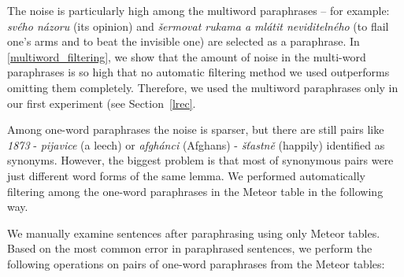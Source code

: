 \documentclass[11pt]{article}
\def\Sref#1{Section~\ref{#1}}
\begin{document}
The noise is particularly high among the multiword paraphrases -- for example: \textit{svého názoru} 
(its opinion) and \textit{šermovat rukama a mlátit neviditelného} (to flail one's arms and to beat 
the invisible one) are selected as a paraphrase. In \ref{multiword_filtering}, we show that the amount 
of noise in the multi-word paraphrases is so high that no automatic filtering method we used outperforms 
omitting them completely. Therefore, we used the multiword paraphrases only in our first experiment (see
\Sref{lrec}.

Among one-word paraphrases the noise is sparser, but there are still pairs like \textit{1873} - 
\textit{pijavice} (a leech) or \textit{afgh\'{a}nci} (Afghans) - \textit{š\v{t}astně} (happily) 
identified as synonyms. However, the biggest problem is that most of synonymous pairs were just 
different word forms of the same lemma. We performed automatically filtering among the one-word
paraphrases in the Meteor table in the following way. %

%
%
%
We manually examine sentences after paraphrasing using only Meteor tables. Based on the 
most common error in paraphrased sentences, we perform the following operations on pairs 
of one-word paraphrases from the Meteor tables:
\end{document}
